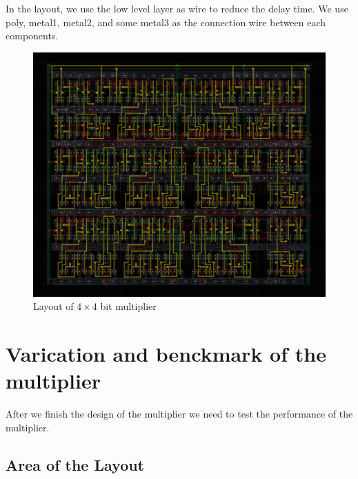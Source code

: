 \documentclass[conference]{IEEEtran}
\begin{document}
In the layout, we use the low level layer as wire to reduce the delay time. We use poly, metal1, metal2, and some metal3 as the connection wire between each components.

\begin{figure}[H]
    \centering
    \includegraphics[width=0.9\linewidth]{4X4_Multiplier_layout.png}
    \caption{Layout of $4 \times 4$ bit multiplier}
    \label{4X4_Multiplier_layout}
\end{figure}

\section{Varication and benckmark of the multiplier}
\label{test}


After we finish the design of the multiplier we need to test the performance of the multiplier.

\subsection{Area of the Layout}
\end{document}
